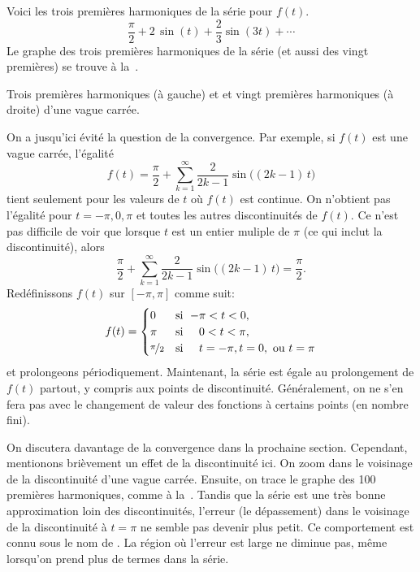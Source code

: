 \begin{example}
Voici les trois premières harmoniques de la série pour  $f(t)$.
\begin{equation*}
\frac{\pi}{2}
+
2 \, \sin (t)
+
\frac{2}{3}  \sin (3t)
+ \cdots
\end{equation*}
Le graphe des trois premières harmoniques de la série (et aussi des vingt premières) se trouve à la~.

\begin{myfig}
\capstart
\caption{Trois premières harmoniques (à gauche) et et vingt premières harmoniques (à droite) d'une vague carrée.\label{ts:squarewavefsfig}}
\end{myfig}
\end{example}

On a jusqu'ici évité la question de la convergence. Par exemple, si  $f(t)$ est une vague carrée, l'égalité 
\begin{equation*}
f(t) = 
\frac{\pi}{2} + \sum_{k=1}^\infty
\frac{2}{2k-1} 
\sin \bigl( (2k-1)\, t \bigr) 
\end{equation*}
tient seulement pour les valeurs de $t$ où $f(t)$ est continue. On n'obtient pas l'égalité pour $t=-\pi,0,\pi$ et toutes les autres discontinuités de $f(t)$. Ce n'est pas difficile de voir que lorsque $t$ est un entier muliple de 
$\pi$ (ce qui inclut la discontinuité), alors
\begin{equation*}
\frac{\pi}{2} + \sum_{k=1}^\infty
\frac{2}{2k-1} 
\sin \bigl( (2k-1)\, t \bigr) = \frac{\pi}{2} .
\end{equation*}
Redéfinissons $f(t)$ sur $[-\pi,\pi]$ comme suit: 
\begin{equation*}
f(t) =
\begin{cases}
0 & \text{si } \; {-\pi} < t < 0 , \\
\pi & \text{si } \; \phantom{-}0 < t < \pi , \\
\nicefrac{\pi}{2} & \text{si } \; \phantom{-}t = -\pi, 
t = 0,\text{ ou }
t = \pi 
\end{cases}
\end{equation*}
et prolongeons périodiquement.  Maintenant, la série est égale au prolongement de $f(t)$ partout, y compris aux points de discontinuité. Généralement, on ne s'en fera pas avec le changement de valeur des fonctions à certains points (en nombre fini). 

On discutera davantage de la convergence dans la prochaine section. Cependant, mentionons brièvement un effet de la discontinuité ici. On zoom dans le voisinage de la discontinuité d'une vague carrée. Ensuite, on trace le graphe des 100 premières harmoniques, comme à 
la~.  Tandis que la
série est une très bonne approximation loin des discontinuités, l'erreur
(le dépassement) dans le voisinage de la discontinuité à $t=\pi$ ne semble pas devenir plus petit. Ce comportement est connu sous le nom de \emph{}.
La région où l'erreur est large ne diminue pas, même lorsqu'on prend plus de termes dans la série. 

